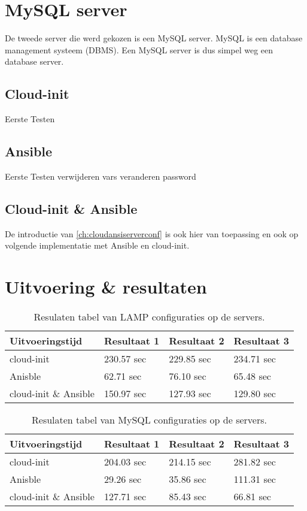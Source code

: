 \section{MySQL server}
De tweede server die werd gekozen is een MySQL server. MySQL is een database management systeem (DBMS). Een MySQL server is dus simpel weg een database server.

\subsection{Cloud-init}
Eerste Testen

\subsection{Ansible}
Eerste Testen
verwijderen vars veranderen password

\subsection{Cloud-init \& Ansible}
De introductie van \ref*{ch:cloudansiserverconf} is ook hier van toepassing en ook op volgende implementatie met Ansible en cloud-init.

\section{Uitvoering \& resultaten}

\begin{table}[!htb]
	\centering
    \begin{tabular}{| l | l | l |l |}
    \hline
    \textbf{Uitvoeringstijd} & Resultaat 1 & Resultaat 2 & Resultaat 3   \\ \hline
    cloud-init & 230.57 sec & 229.85 sec & 234.71 sec  \\ \hline
    Anisble & 62.71 sec & 76.10 sec & 65.48 sec \\ \hline
    cloud-init \& Ansible & 150.97 sec & 127.93 sec & 129.80 sec \\
    \hline
    \end{tabular}
	\caption{Resulaten tabel van LAMP configuraties op de servers.}
	\label{tab:tabel lamp resultaten server}
\end{table}

\begin{table}[!htb]
    \centering
    \begin{tabular}{| l | l | l |l |}
        \hline
        \textbf{Uitvoeringstijd} & Resultaat 1 & Resultaat 2 & Resultaat 3   \\ \hline
        cloud-init & 204.03 sec & 214.15 sec & 281.82 sec  \\ \hline
        Anisble & 29.26 sec & 35.86 sec & 111.31 sec \\ \hline
        cloud-init \& Ansible & 127.71 sec & 85.43 sec & 66.81 sec \\
        \hline
    \end{tabular}
    \caption{Resulaten tabel van MySQL configuraties op de servers.}
    \label{tab:tabel mysql resultaten server}
\end{table}

